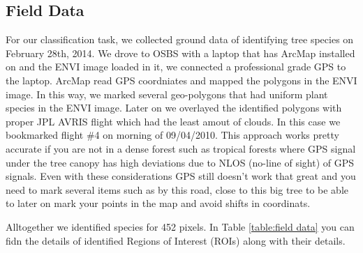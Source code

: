\documentclass[remotesensing,article,accept,moreauthors,pdftex,12pt,a4paper]{mdpi}
\begin{document}
\subsection{Field Data}


For our classification task, we collected ground data of identifying tree species on February 28th, 2014. We drove to OSBS with a laptop that has ArcMap installed on and the ENVI image loaded in it, we connected a professional grade GPS to the laptop. ArcMap read GPS coordniates and mapped the polygons in the ENVI image. In this way, we marked several geo-polygons that had uniform plant species in the ENVI image. Later on we overlayed the identified polygons with proper JPL AVRIS flight which had the least amout of clouds. In this case we bookmarked flight \#4 on morning of 09/04/2010. This approach works pretty accurate if you are not in a dense forest such as tropical forests where GPS signal under the tree canopy has high deviations due to NLOS (no-line of sight) of GPS signals. Even with these considerations GPS still doesn't work that great and you need to mark several items such as by this road, close to this big tree to be able to later on mark your points in the map and avoid shifts in coordinats.

Alltogether we identified species for 452 pixels. In Table \ref{table:field data} you can fidn the details of identified Regions of Interest (ROIs) along with their details. 







\end{document}
